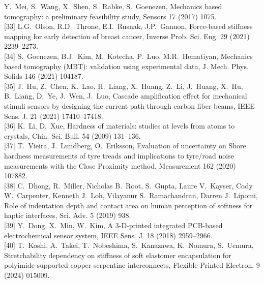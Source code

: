 \documentclass[11pt]{article}
\begin{document}
\begin{footnotesize}
[32] Y.~Mei, S.~Wang, X.~Shen, S.~Rabke, S.~Goenezen, Mechanics
based tomography: a preliminary feasibility study, Sensors 17 (2017)
1075.\\[2pt]
[33] L.G.~Olson, R.D.~Throne, E.I.~Rusnak, J.P.~Gannon, Force-based
stiffness mapping for early detection of breast cancer, Inverse
Prob. Sci. Eng. 29 (2021) 2239--2273.\\[2pt]
[34] S.~Goenezen, B.J.~Kim, M.~Kotecha, P.~Luo, M.R.~Hematiyan,
Mechanics based tomography (MBT): validation using experimental
data, J. Mech. Phys. Solids 146 (2021) 104187.\\[2pt]
[35] J.~Hu, Z.~Chen, K.~Lao, H.~Liang, X.~Huang, Z.~Li, J.~Huang,
X.~Hu, B.~Liang, D.~Ye, J.~Wen, J.~Luo, Cascade amplification
effect for mechanical stimuli sensors by designing the current path
through carbon fiber beams, IEEE Sens. J. 21 (2021) 17410--17418.\\[2pt]
[36] K.~Li, D.~Xue, Hardness of materials: studies at levels from
atoms to crystals, Chin. Sci. Bull. 54 (2009) 131--136.\\[2pt]
[37] T.~Vieira, J.~Lundberg, O.~Eriksson, Evaluation of uncertainty
on Shore hardness measurements of tyre treads and implications to
tyre/road noise measurements with the Close Proximity method,
Measurement 162 (2020) 107882.\\[2pt]
[38] C.~Dhong, R.~Miller, Nicholas B.~Root, S.~Gupta,
Laure V.~Kayser, Cody W.~Carpenter, Kenneth J.~Loh,
Vilayanur S.~Ramachandran, Darren J.~Lipomi, Role of indentation
depth and contact area on human perception of softness for haptic
interfaces, Sci. Adv. 5 (2019) 938.\\[2pt]
[39] Y.~Dong, X.~Min, W.~Kim, A 3-D-printed integrated PCB-based
electrochemical sensor system, IEEE Sens. J. 18 (2018) 2959--2966.\\[2pt]
[40] T.~Koshi, A.~Takei, T.~Nobeshima, S.~Kanazawa, K.~Nomura,
S.~Uemura, Stretchability dependency on stiffness of soft
elastomer encapsulation for polyimide-supported copper serpentine
interconnects, Flexible Printed Electron. 9 (2024) 015009.
\end{footnotesize}
\end{document}
